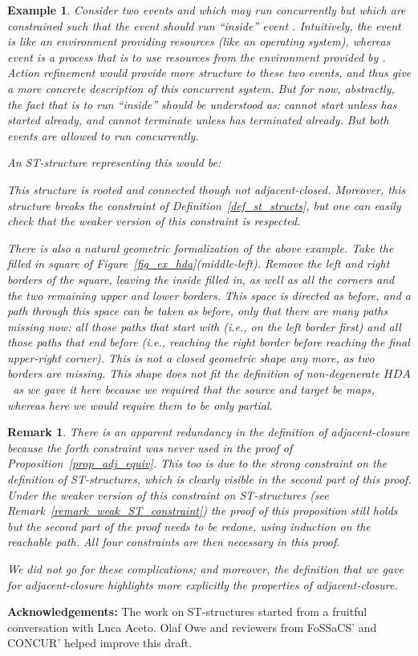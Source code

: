 \documentclass[submission,copyright,creativecommons]{eptcs}
\newtheorem{example}[theorem]{Example}
\newtheorem{remark}[theorem]{Remark}
\newcommand\HDA{\ensuremath{\mathit{HDA}}}
\begin{document}
\begin{example}\label{example_weakerConstraint_on_ST}
Consider two events  and  which may run concurrently but which are constrained such that the event  should run ``inside'' event . Intuitively, the event  is like an environment providing resources (like an operating system), whereas event  is a process that is to use resources from the environment provided by . Action refinement would provide more structure to these two events, and thus give a more concrete description of this concurrent system. But for now, abstractly, the fact that  is to run ``inside''  should be understood as:  cannot start unless  has started already, and  cannot terminate unless  has terminated already. But both events are allowed to run concurrently.

An ST-structure representing this would be: 

This structure is rooted and connected though not adjacent-closed. Moreover, this structure breaks the constraint of Definition~\ref{def_st_structs}, but one can easily check that the weaker version of this constraint is respected.

There is also a natural geometric formalization of the above example. Take the filled in square of Figure~\ref{fig_ex_hda}(middle-left). Remove the left and right borders of the square, leaving the inside filled in, as well as all the corners and the two remaining upper and lower borders. This space is directed as before, and a path through this space can be taken as before, only that there are many paths missing now: all those paths that start with  (i.e., on the left border first) and all those paths that end  before  (i.e., reaching the right border before reaching the final upper-right corner). This is not a closed geometric shape any more, as two borders are missing. This shape does not fit the definition of non-degenerate \HDA\ as we gave it here because we required that the source and target be \textit{maps}, whereas here we would require them to be only \textit{partial}. 
\end{example}



\begin{remark}\label{remark_redundancy}
There is an apparent redundancy in the definition of adjacent-closure because the forth constraint was never used in the proof of Proposition~\ref{prop_adj_equiv}. This too is due to the strong constraint on the definition of ST-structures, which is clearly visible in the second part of this proof.
Under the weaker version of this constraint on ST-structures (see Remark~\ref{remark_weak_ST_constraint}) the proof of this proposition still holds but the second part of the proof needs to be redone, using induction on the reachable path. All four constraints are then necessary in this proof.

We did not go for these complications; and moreover, the definition that we gave for adjacent-closure highlights more explicitly the properties of adjacent-closure. 
\end{remark}


\vspace{1ex}\noindent\textbf{Acknowledgements: }
The work on ST-structures started from a fruitful conversation with Luca Aceto.
Olaf Owe and reviewers from FoSSaCS' and CONCUR' helped improve this draft.










\end{document}
